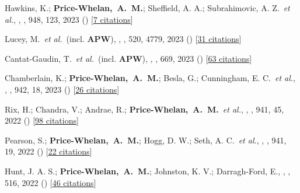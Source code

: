 \item[{\color{deemph}\scriptsize115}]Hawkins, K.; \textbf{Price-Whelan,~A.~M.}; Sheffield, A. A.; Subrahimovic, A. Z.~\textit{et al.}, , \apj, 948, 123, 2023 () [\href{http://adsabs.harvard.edu/abs/2023ApJ...948..123H}{7 citations}]

\item[{\color{deemph}\scriptsize114}]Lucey, M.~\textit{et al.}~(incl. \textbf{APW}), , \mnras, 520, 4779, 2023 () [\href{http://adsabs.harvard.edu/abs/2023MNRAS.520.4779L}{31 citations}]

\item[{\color{deemph}\scriptsize113}]Cantat-Gaudin, T.~\textit{et al.}~(incl. \textbf{APW}), , \aanda, 669, 2023 () [\href{http://adsabs.harvard.edu/abs/2023A&A...669A..55C}{63 citations}]

\item[{\color{deemph}\scriptsize112}]Chamberlain, K.; \textbf{Price-Whelan,~A.~M.}; Besla, G.; Cunningham, E. C.~\textit{et al.}, , \apj, 942, 18, 2023 () [\href{http://adsabs.harvard.edu/abs/2023ApJ...942...18C}{26 citations}]

\item[{\color{deemph}\scriptsize111}]Rix, H.; Chandra, V.; Andrae, R.; \textbf{Price-Whelan,~A.~M.}~\textit{et al.}, , \apj, 941, 45, 2022 () [\href{http://adsabs.harvard.edu/abs/2022ApJ...941...45R}{98 citations}]

\item[{\color{deemph}\scriptsize110}]Pearson, S.; \textbf{Price-Whelan,~A.~M.}; Hogg, D. W.; Seth, A. C.~\textit{et al.}, , \apj, 941, 19, 2022 () [\href{http://adsabs.harvard.edu/abs/2022ApJ...941...19P}{22 citations}]

\item[{\color{deemph}\scriptsize109}]Hunt, J. A. S.; \textbf{Price-Whelan,~A.~M.}; Johnston, K. V.; Darragh-Ford, E., , \mnras, 516, 2022 () [\href{http://adsabs.harvard.edu/abs/2022MNRAS.516L...7H}{46 citations}]

